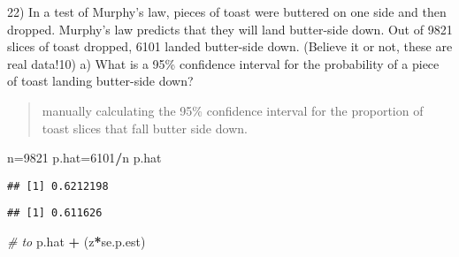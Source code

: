 \documentclass[ignorenonframetext,]{beamer}
\newenvironment{Shaded}{\begin{snugshade}}{\end{snugshade}}
\newcommand{\DecValTok}[1]{\textcolor[rgb]{0.00,0.00,0.81}{#1}}
\newcommand{\FloatTok}[1]{\textcolor[rgb]{0.00,0.00,0.81}{#1}}
\newcommand{\StringTok}[1]{\textcolor[rgb]{0.31,0.60,0.02}{#1}}
\newcommand{\CommentTok}[1]{\textcolor[rgb]{0.56,0.35,0.01}{\textit{#1}}}
\newcommand{\ControlFlowTok}[1]{\textcolor[rgb]{0.13,0.29,0.53}{\textbf{#1}}}
\newcommand{\OperatorTok}[1]{\textcolor[rgb]{0.81,0.36,0.00}{\textbf{#1}}}
\newcommand{\NormalTok}[1]{#1}
\begin{document}
\begin{frame}[fragile]{22) In a test of Murphy's law, pieces of toast
were buttered on one side and then dropped. Murphy's law predicts that
they will land butter-side down. Out of 9821 slices of toast dropped,
6101 landed butter-side down. (Believe it or not, these are real
data!10) \textbar{} a) What is a 95\% confidence interval for the
probability of a piece of toast landing butter-side down?}

\begin{quote}
manually calculating the 95\% confidence interval for the proportion of
toast slices that fall butter side down.
\end{quote}

\begin{Shaded}
\begin{Highlighting}[]
\NormalTok{n=}\DecValTok{9821}
\NormalTok{p.hat=}\DecValTok{6101}\OperatorTok{/}\NormalTok{n}
\NormalTok{p.hat}
\end{Highlighting}
\end{Shaded}

\begin{verbatim}
## [1] 0.6212198
\end{verbatim}

\begin{Shaded}
\end{Shaded}

\begin{verbatim}
## [1] 0.611626
\end{verbatim}

\begin{Shaded}
\begin{Highlighting}[]
\CommentTok{# to}
\NormalTok{p.hat }\OperatorTok{+}\StringTok{ }\NormalTok{(z}\OperatorTok{*}\NormalTok{se.p.est)}
\end{Highlighting}
\end{Shaded}


\end{frame}
\end{document}

